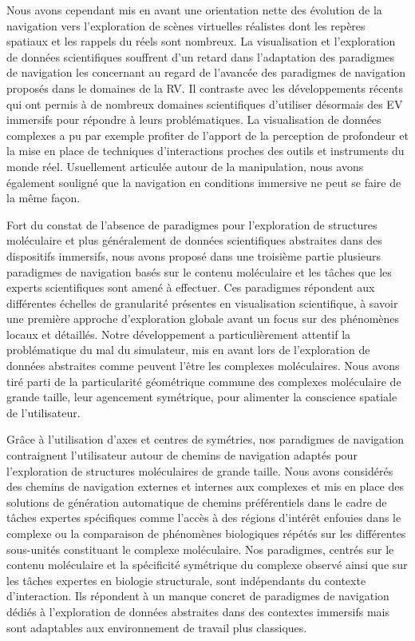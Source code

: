 Nous avons cependant mis en avant une orientation nette des évolution de la navigation vers l'exploration de scènes virtuelles réalistes dont les repères spatiaux et les rappels du réels sont nombreux. La visualisation et l'exploration de données scientifiques souffrent d'un retard dans l'adaptation des paradigmes de navigation les concernant au regard de l'avancée des paradigmes de navigation proposés dans le domaines de la RV.
Il contraste avec les développements récents qui ont permis à de nombreux domaines scientifiques d'utiliser désormais des EV immersifs pour répondre à leurs problématiques. La visualisation de données complexes a pu par exemple profiter de l'apport de la perception de profondeur et la mise en place de techniques d'interactions proches des outils et instruments du monde réel. Usuellement articulée autour de la manipulation, nous avons également souligné que la navigation en conditions immersive ne peut se faire de la même façon. 



Fort du constat de l'absence de paradigmes pour l'exploration de structures moléculaire et plus généralement de données scientifiques abstraites dans des dispositifs immersifs, nous avons proposé dans une troisième partie plusieurs paradigmes de navigation basés sur le contenu moléculaire et les tâches que les experts scientifiques sont amené à effectuer. Ces paradigmes répondent aux différentes échelles de granularité présentes en visualisation scientifique, à savoir une première approche d'exploration globale avant un focus sur des phénomènes locaux et détaillés. Notre développement a particulièrement attentif la problématique du mal du simulateur, mis en avant lors de l'exploration de données abstraites comme peuvent l'être les complexes moléculaires. Nous avons tiré parti de la particularité géométrique commune des complexes moléculaire de grande taille, leur agencement symétrique, pour alimenter la conscience spatiale de l'utilisateur.

Grâce à l'utilisation d'axes et centres de symétries, nos paradigmes de navigation contraignent l'utilisateur autour de chemins de navigation adaptés pour l'exploration de structures moléculaires de grande taille. Nous avons considérés des chemins de navigation externes et internes aux complexes et mis en place des solutions de génération automatique de chemins préférentiels dans le cadre de tâches expertes spécifiques comme l'accès à des régions d'intérêt enfouies dans le complexe ou la comparaison de phénomènes biologiques répétés sur les différentes sous-unités constituant le complexe moléculaire.
Nos paradigmes, centrés sur le contenu moléculaire et la spécificité symétrique du complexe observé ainsi que sur les tâches expertes en biologie structurale, sont indépendants du contexte d'interaction. Ils répondent à un manque concret de paradigmes de navigation dédiés à l'exploration de données abstraites dans des contextes immersifs mais sont adaptables aux environnement de travail plus classiques. 


